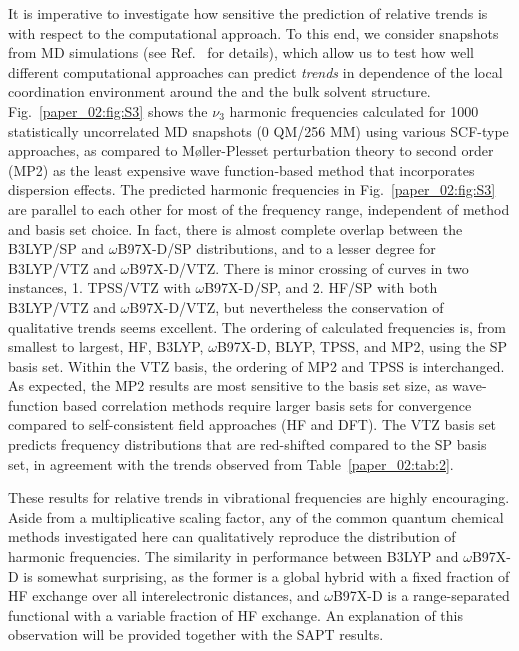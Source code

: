 \documentclass[%
  class = book,%
  crop = false,%
  float = true,%
  multi = true,%
  preview = false,%
]{standalone}
\begin{document}
It is imperative to investigate how sensitive the prediction of relative trends is with respect to the computational approach. To this end, we consider snapshots from MD simulations (see Ref.~\parencite{Daly2016} for details), which allow us to test how well different computational approaches can predict \emph{trends} in dependence of the local coordination environment around the  and the bulk solvent structure. Fig.~\ref{paper_02:fig:S3} shows the  \(\nu_{3}\) harmonic frequencies calculated for \num{1000} statistically uncorrelated MD snapshots (0 QM/256 MM) using various SCF-type approaches, as compared to Møller-Plesset perturbation theory to second order (MP2) as the least expensive wave function-based method that incorporates dispersion effects.\cite{WCMS:WCMS58} The predicted harmonic frequencies in Fig.~\ref{paper_02:fig:S3} are parallel to each other for most of the frequency range, independent of method and basis set choice. In fact, there is almost complete overlap between the B3LYP/SP and \(\omega\)B97X-D/SP distributions, and to a lesser degree for B3LYP/VTZ and \(\omega\)B97X-D/VTZ. There is minor crossing of curves in two instances, 1. TPSS/VTZ with \(\omega\)B97X-D/SP, and 2. HF/SP with both B3LYP/VTZ and \(\omega\)B97X-D/VTZ, but nevertheless the conservation of qualitative trends seems excellent. The ordering of calculated frequencies is, from smallest to largest, HF, B3LYP, \(\omega\)B97X-D, BLYP, TPSS, and MP2, using the SP basis set. Within the VTZ basis, the ordering of MP2 and TPSS is interchanged. As expected, the MP2 results are most sensitive to the basis set size, as wave-function based correlation methods require larger basis sets for convergence compared to self-consistent field approaches (HF and DFT). The VTZ basis set predicts frequency distributions that are red-shifted compared to the SP basis set, in agreement with the trends observed from Table~\ref{paper_02:tab:2}.

These results for relative trends in vibrational frequencies are highly encouraging. Aside from a multiplicative scaling factor, any of the common quantum chemical methods investigated here can qualitatively reproduce the distribution of harmonic frequencies. The similarity in performance between B3LYP and \(\omega\)B97X-D is somewhat surprising, as the former is a global hybrid with a fixed fraction of HF exchange over all interelectronic distances, and \(\omega\)B97X-D is a range-separated functional with a variable fraction of HF exchange. An explanation of this observation will be provided together with the SAPT results.
\end{document}
